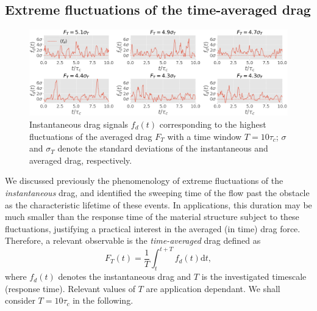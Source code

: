 \documentclass[pre,aps,floatfix,10pt,superscriptaddress, notitlepage,preprint]{revtex4-1}
\begin{document}
\subsection{Extreme fluctuations of the time-averaged drag }
\label{sec:time_avg}


\begin{figure}
	\centering
	\includegraphics[width=\linewidth]{timeseries_extrms_AVG/timeseries_extrms_AVG}
	\caption{Instantaneous drag signals $f_d(t)$ corresponding to the highest fluctuations of the averaged  drag $F_T$ with a time window $T = 10 \tau_c$;  $\sigma$ and $\sigma_T$ denote the standard deviations of the instantaneous and averaged drag, respectively.}
	\label{fig:extreme_avg}
\end{figure}


%

We discussed previously the phenomenology of extreme fluctuations of the \emph{instantaneous} drag, and identified the sweeping time of the flow past the obstacle as the characteristic lifetime of these events. 
%
In applications, this duration may be much smaller than the response time of the material structure subject to these fluctuations, justifying a practical interest in the averaged (in time) drag force. 
%
%
Therefore, a relevant observable is the \textit{time-averaged} drag defined as
\begin{equation}
  \label{eq:def_time_averaged_drag}
  F_T(t) = \frac{1}{T}\int_t^{t+T} f_d(t) \mathrm{d}t,
\end{equation}
where $f_d(t)$ denotes the instantaneous drag and $T$ is the investigated timescale (response time). Relevant values of $T$ are application dependant. We shall consider $T=10\tau_c$ in the following.
\end{document}
